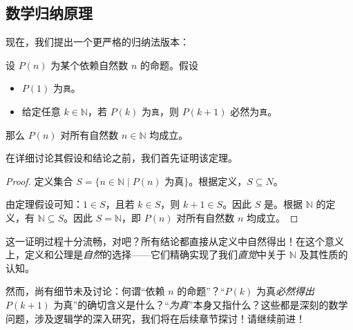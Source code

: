 \subsection{数学归纳原理}\label{sec:section3.8.2}

现在，我们提出一个更严格的归纳法版本：

\begin{theorem}[数学归纳原理]\label{theorem3.8}
    设 $P(n)$ 为某个依赖自然数 $n$ 的命题。假设
    \begin{itemize}
        \item $P(1)$ 为\verb|真|。
        \item 给定任意 $k \in \mathbb{N}$，若 $P(k)$ 为\verb|真|，则 $P(k+1)$ 必然为\verb|真|。
    \end{itemize}
    那么 $P(n)$ 对所有自然数 $n \in \mathbb{N}$ 均成立。
\end{theorem}

在详细讨论其假设和结论之前，我们首先证明该定理。

\begin{proof}
    定义集合 $S = \{n \in \mathbb{N} \mid P(n) \text{\ 为真}\}$。根据定义，$S \subseteq N$。

    由定理假设可知：$1 \in S$，且若 $k \in S$，则 $k + 1 \in S$。因此 $S$ 是。根据 $\mathbb{N}$ 的定义，有 $\mathbb{N} \subseteq S$。因此 $S = \mathbb{N}$，即 $P(n)$ 对所有自然数 $n$ 均成立。
\end{proof}

这一证明过程十分流畅，对吧？所有结论都直接从定义中自然得出！在这个意义上，定义和公理是\emph{自然}的选择——它们精确实现了我们\emph{直觉}中关于 $\mathbb{N}$ 及其性质的认知。

然而，尚有细节未及讨论：何谓``依赖 $n$ 的命题''？``$P(k)$ 为真\emph{必然得出} $P(k + 1)$ 为真''的确切含义是什么？``\emph{为真}''本身又指什么？这些都是深刻的数学问题，涉及逻辑学的深入研究，我们将在后续章节探讨！请继续前进！
